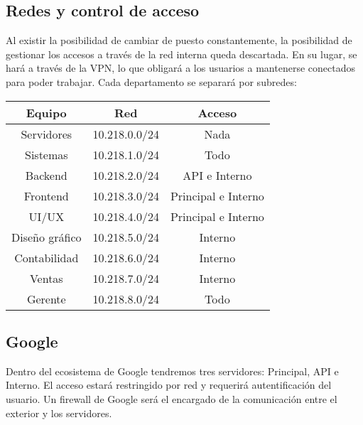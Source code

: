 \subsection{Redes y control de acceso}
Al existir la posibilidad de cambiar de puesto constantemente, la posibilidad de gestionar los accesos a través de la red interna queda descartada. En su lugar, se hará a través de la VPN, lo que obligará a los usuarios a mantenerse conectados para poder trabajar. Cada departamento se separará por subredes:
\begin{table}[h!]
\centering
\begin{tabular}{|c|c|c|}
\hline
Equipo         & Red         & Acceso      \\ \hline
Servidores     & 10.218.0.0/24       & Nada        \\ \hline
Sistemas     & 10.218.1.0/24       & Todo        \\ \hline
Backend      & 10.218.2.0/24        & API e Interno       \\ \hline
Frontend       & 10.218.3.0/24       & Principal e Interno        \\ \hline
UI/UX         & 10.218.4.0/24          & Principal e Interno        \\ \hline
Diseño gráfico       & 10.218.5.0/24 & Interno        \\ \hline
Contabilidad & 10.218.6.0/24   & Interno        \\ \hline
Ventas   & 10.218.7.0/24         & Interno        \\ \hline
Gerente      & 10.218.8.0/24        & Todo        \\ \hline
\end{tabular}
\label{tab:tabla_personal}
\end{table}
\subsection{Google}
Dentro del ecosistema de Google tendremos tres servidores: Principal, API e Interno. El acceso estará restringido por red y requerirá autentificación del usuario. Un firewall de Google será el encargado de la comunicación entre el exterior y los servidores.
